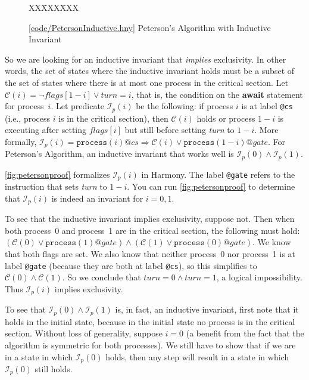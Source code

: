 \documentclass{report}
\newcommand{\harmonysource}[1]{
\begin{tabbing}
XX\=XXX\=XXX\kill
    
\end{tabbing}
}
\newcommand{\harmonylink}[1]{%
[\href{https://www.cs.cornell.edu/home/rvr/harmony/#1}{\underline{#1}}]%
}
\newenvironment{code}{
\tcolorbox
}{
\endtcolorbox
}
\begin{document}
\begin{figure}
\begin{code}
\harmonysource{PetersonInductive}
\end{code}
\caption{\harmonylink{code/PetersonInductive.hny} Peterson's Algorithm with Inductive Invariant}
\label{fig:petersonproof}
\end{figure}

So we are looking for an inductive invariant that \emph{implies} exclusivity.
In other words, the set of states where the inductive invariant holds
must be a subset of the set of states where there is at most one process in
the critical section.
Let $\mathcal{C}(i) = \lnot\mathit{flags}[1 - i] \lor
\mathit{turn} = i$, that is, the condition on the \textbf{await}
statement for process~$i$.
Let predicate $\mathcal{I}_p(i)$ be the following:
if process $i$ is at label \texttt{@cs} (i.e., process $i$ is in the critical section),
then $\mathcal{C}(i)$ holds or process $1-i$ is executing after setting
$\mathit{flags}[i]$ but still before setting \textit{turn} to $1-i$.
More formally, $\mathcal{I}_p(i) = \mathtt{process}(i)@cs \Rightarrow \mathcal{C}(i) \lor \mathtt{process}(1-i)@gate$.
For Peterson's Algorithm, an inductive invariant that works well is
$\mathcal{I}_p(0) \land \mathcal{I}_p(1)$.

\autoref{fig:petersonproof} formalizes $\mathcal{I}_p(i)$ in Harmony.
The label \texttt{@gate} refers to the instruction that sets \textit{turn} to $1-i$.
You can run \autoref{fig:petersonproof} to determine
that $\mathcal{I}_p(i)$ is indeed an invariant for $i = 0, 1$.

To see that the inductive invariant implies exclusivity, suppose not.  Then
when both process~0 and process~1 are in the critical section, the
following must hold:
$(\mathcal{C}(0) \lor \mathtt{process}(1)@gate) \land
 (\mathcal{C}(1) \lor \mathtt{process}(0)@gate)$.
We know that both flags are set.
We also know that neither process~0 nor process~1 is at label \texttt{@gate}
(because they are both at label \texttt{@cs}),
so this simplifies to $\mathcal{C}(0) \land \mathcal{C}(1)$.
So we conclude that $\mathit{turn} = 0 \land \mathit{turn} = 1$, a
logical impossibility.  Thus $\mathcal{I}_p(i)$ implies exclusivity.

To see that $\mathcal{I}_p(0) \land \mathcal{I}_p(1)$ is, in fact, an inductive invariant, first note that
it holds in the initial state, because in the initial state no process
is in the critical section.
Without loss of generality, suppose $i=0$ (a benefit from the fact that the algorithm is
symmetric for both processes).  We still have to show that if we are in a state
in which $\mathcal{I}_p(0)$ holds, then any step will result in a state in which
$\mathcal{I}_p(0)$ still holds.
\end{document}
